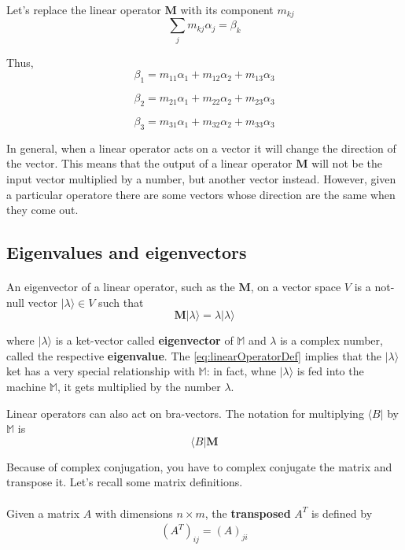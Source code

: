 \documentclass[a4paper,10pt]{article}
\begin{document}
Let's replace the linear operator $\mathbf{M}$ with its component $m_{kj}$
$$\sum\limits_{j}m_{kj}\alpha_j = \beta_k$$

Thus,
$$\beta_1 = m_{11}\alpha_1 + m_{12}\alpha_2 + m_{13}\alpha_3$$

$$\beta_2 = m_{21}\alpha_1 + m_{22}\alpha_2 + m_{23}\alpha_3$$

$$\beta_3 = m_{31}\alpha_1 + m_{32}\alpha_2 + m_{33}\alpha_3$$

In general, when a linear operator acts on a vector it will change the direction of the vector. This means that the output of a linear operator $\mathbf{M}$ will not be the input vector multiplied by a number, but another vector instead. However, given a particular operatore there are some vectors whose direction are the same when they come out.

\subsection{Eigenvalues and eigenvectors}

\paragraph{} An eigenvector of a linear operator, such as the $\mathbf{M}$, on a vector space $V$ is a not-null vector $|\lambda\rangle \in V$ such that
\begin{equation}
\mathbf{M}|\lambda\rangle = \lambda|\lambda\rangle
\label{eq:linearOperatorDef}
\end{equation}

where $|\lambda\rangle$ is a ket-vector called \textbf{eigenvector} of $\mathbb{M}$ and $\lambda$ is a complex number, called the respective \textbf{eigenvalue}. The \autoref{eq:linearOperatorDef} implies that the $|\lambda\rangle$ ket has a very special relationship with $\mathbb{M}$: in fact, whne $|\lambda\rangle$ is fed into the machine $\mathbb{M}$, it gets multiplied by the number $\lambda$.

Linear operators can also act on bra-vectors. The notation for multiplying $\langle B|$ by $\mathbb{M}$ is
\begin{equation*}
\langle B|\mathbf{M}
\end{equation*}

Because of complex conjugation, you have to complex conjugate the matrix and transpose it. Let's recall some matrix definitions.

\paragraph{} Given a matrix $A$ with dimensions $n \times m$, the \textbf{transposed} $A^T$ is defined by
\begin{equation}
\begin{aligned}
(A^T)_{ij} = (A)_{ji}
\end{aligned}
\label{eq:transposedMatrix}
\end{equation}
\end{document}
